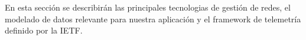 En esta sección se describirán las principales tecnologias de gestión de redes, el modelado de datos relevante para nuestra aplicación y el framework de telemetría definido por la \gls{IETF}.